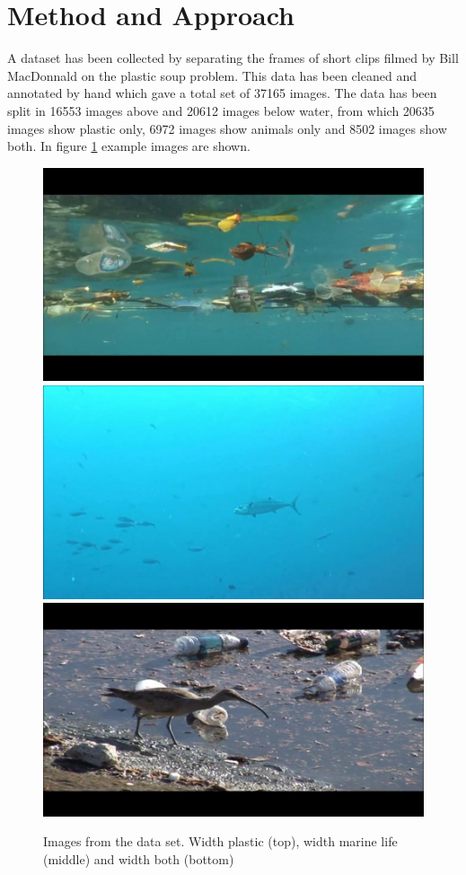 \documentclass[a4paper, 11pt]{article}
\begin{document}


\section{Method and Approach}
A dataset has been collected by separating the frames of short clips filmed by Bill MacDonnald on the plastic soup problem. This data has been cleaned and annotated by hand which gave a total set of 37165 images. The data has been split in 16553 images above and 20612 images below water, from which 20635 images show plastic only, 6972 images show animals only and 8502 images show both. In figure \ref{fig:plastic-data} example images are shown.

\begin{figure}[h!bt]
\centering
\includegraphics[keepaspectratio=true,width=.5\textwidth]{images/10947_01.jpg}\\
\includegraphics[keepaspectratio=true,width=.5\textwidth]{images/19358_10.jpg}\\
\includegraphics[keepaspectratio=true,width=.5\textwidth]{images/9077_11.jpg}
\caption{Images from the data set. Width plastic (top), width marine life (middle) and width both (bottom)}
\label{fig:plastic-data}
\end{figure}
\end{document}
